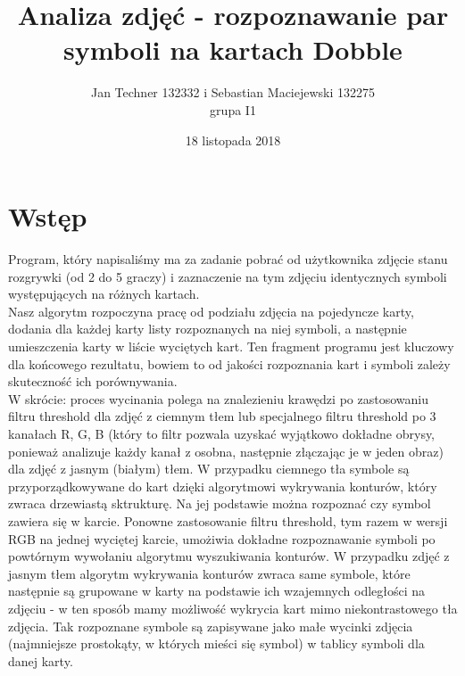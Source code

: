 \documentclass[10pt,a4paper]{article}
\author{Jan Techner 132332 i Sebastian Maciejewski 132275 \\ grupa I1}
\title{Analiza zdjęć - rozpoznawanie par symboli na kartach Dobble}
\date{18 listopada 2018}
\newcommand{\forceindent}{\leavevmode{\parindent=3em\indent}}
\begin{document}
\maketitle
\section{Wstęp}

\forceindent Program, który napisaliśmy ma za zadanie pobrać od użytkownika zdjęcie stanu rozgrywki (od 2 do 5 graczy) i zaznaczenie na tym zdjęciu identycznych symboli występujących na różnych kartach. \\
Nasz algorytm rozpoczyna pracę od podziału zdjęcia na pojedyncze karty, dodania dla każdej karty listy rozpoznanych na niej symboli, a następnie umieszczenia karty w 
liście wyciętych kart. Ten fragment programu jest kluczowy dla końcowego rezultatu, bowiem to od jakości rozpoznania kart i symboli zależy skuteczność ich porównywania. \\

W skrócie: proces wycinania polega na znalezieniu krawędzi po zastosowaniu filtru threshold dla zdjęć z ciemnym tłem lub specjalnego filtru threshold po 3 kanałach R, G, B (który to filtr pozwala uzyskać wyjątkowo dokładne obrysy, ponieważ analizuje każdy kanał z osobna, następnie złączając je w jeden obraz) dla zdjęć z jasnym (białym) tłem. W przypadku ciemnego tła symbole są przyporządkowywane do kart dzięki algorytmowi wykrywania konturów, który zwraca drzewiastą sktrukturę. Na jej podstawie można rozpoznać czy symbol zawiera się w karcie. Ponowne zastosowanie filtru threshold, tym razem w wersji RGB na jednej wyciętej karcie, umożiwia dokładne rozpoznawanie symboli po powtórnym wywołaniu algorytmu wyszukiwania konturów. W przypadku zdjęć z jasnym tłem algorytm wykrywania konturów zwraca same symbole, które następnie są grupowane w karty na podstawie ich wzajemnych odległości na zdjęciu - w ten sposób mamy możliwość wykrycia kart mimo niekontrastowego tła zdjęcia. Tak rozpoznane symbole są zapisywane jako małe wycinki zdjęcia (najmniejsze prostokąty, w których mieści się symbol) w tablicy symboli dla danej karty. \\
\end{document}
